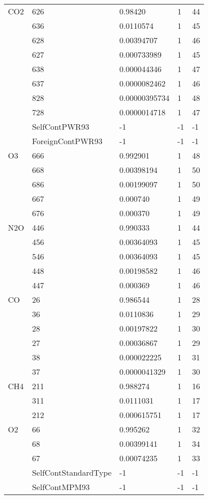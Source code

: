 \begin{longtable}{lllll}
\hline                  
  CO2& 626&  0.98420&  1&44\\
     & 636&  0.0110574&  1&45\\
     & 628&  0.00394707&  1&46\\
     & 627&  0.000733989&  1&45\\
     & 638&  0.000044346&  1&47\\
     & 637&  0.0000082462&  1&46\\
     & 828&  0.00000395734&  1&48\\
     & 728&  0.0000014718&  1&47\\
     &SelfContPWR93&        -1  &-1     &-1     \\
     &ForeignContPWR93&     -1  &-1     &-1     \\
\hline                  
  O3& 666&   0.992901&  1&48\\
    & 668&   0.00398194&  1&50\\
    & 686&   0.00199097&  1&50\\
    & 667&   0.000740&  1&49\\
    & 676&   0.000370&  1&49\\
\hline                  
  N2O& 446&  0.990333&  1&44\\
     & 456&  0.00364093&  1&45\\
     & 546&  0.00364093&  1&45\\
     & 448&  0.00198582&  1&46\\
     & 447&  0.000369&  1&46\\
\hline                   
  CO& 26&  0.986544&  1&28\\
    & 36&  0.0110836&  1&29\\
    & 28&  0.00197822&  1&30\\
    & 27&  0.00036867&  1&29\\
    & 38&  0.000022225&  1&31\\
    & 37&  0.0000041329&  1&30\\
\hline                  
  CH4& 211&  0.988274&  1&16\\
     & 311&  0.0111031&  1&17\\
     & 212&  0.000615751&  1&17\\
\hline                  
  O2& 66&  0.995262&  1&32\\
    & 68&  0.00399141&  1&34\\
    & 67&  0.00074235&  1&33\\
    &SelfContStandardType&      -1      &-1     &-1     \\
    &SelfContMPM93&             -1      &-1     &-1     \\

\end{longtable}
